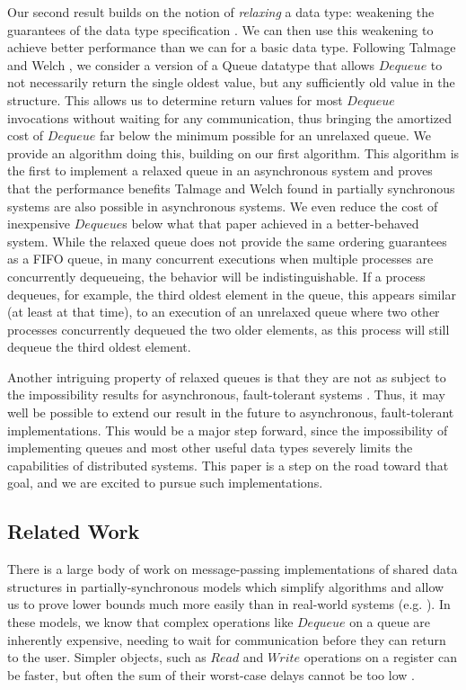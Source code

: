 \documentclass[a4paper,anonymous,USenglish]{lipics-v2021}
\theoremstyle{definition}
\begin{document}
Our second result builds on the notion of \emph{relaxing} a data type: weakening the guarantees of the data type specification \cite{HenzingerKirschPayerSezginSokolova13}.  We can then use this weakening to achieve better performance than we can for a basic data type.  Following Talmage and Welch \cite{TalmageWelch14}, we consider a version of a Queue datatype that allows $Dequeue$ to not necessarily return the single oldest value, but any sufficiently old value in the structure.  This allows us to determine return values for most $Dequeue$ invocations without waiting for any communication, thus bringing the amortized cost of $Dequeue$ far below the minimum possible for an unrelaxed queue.  We provide an algorithm doing this, building on our first algorithm.  This algorithm is the first to implement a relaxed queue in an asynchronous system and proves that the performance benefits Talmage and Welch \cite{TalmageWelch14} found in partially synchronous systems are also possible in asynchronous systems.  We even reduce the cost of inexpensive $Dequeue$s below what that paper achieved in a better-behaved system.  While the relaxed queue does not provide the same ordering guarantees as a FIFO queue, in many concurrent executions when multiple processes are concurrently dequeueing, the behavior will be indistinguishable.  If a process dequeues, for example, the third oldest element in the queue, this appears similar (at least at that time), to an execution of an unrelaxed queue where two other processes concurrently dequeued the two older elements, as this process will still dequeue the third oldest element.

Another intriguing property of relaxed queues is that they are not as subject to the impossibility results for asynchronous, fault-tolerant systems \cite{ShavitTaubenfeld16,TalmageWelch19}.  Thus, it may well be possible to extend our result in the future to asynchronous, fault-tolerant implementations.  This would be a major step forward, since the impossibility of implementing queues and most other useful data types severely limits the capabilities of distributed systems.  This paper is a step on the road toward that goal, and we are excited to pursue such implementations.

\subsection{Related Work}

There is a large body of work on message-passing implementations of shared data structures in partially-synchronous models which simplify algorithms and allow us to prove lower bounds much more easily than in real-world systems (e.g. \cite{Kosa99, WangTalmageLeeWelch18, ChandraHadzilacosToueg16}).  In these models, we know that complex operations like $Dequeue$ on a queue are inherently expensive, needing to wait for communication before they can return to the user.  Simpler objects, such as $Read$ and $Write$ operations on a register can be faster, but often the sum of their worst-case delays cannot be too low \cite{MavronicolasRoth99}.
\end{document}

